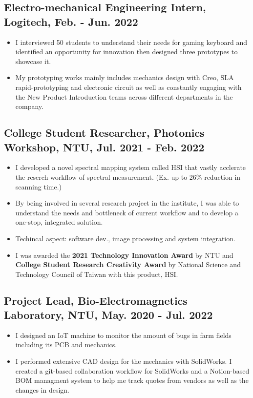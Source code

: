 \documentclass[12pt]{article}
\begin{document}
        \subsection*{Electro-mechanical Engineering Intern, Logitech, Feb. - Jun. 2022}
        {\sffamily
        \begin{itemize}
            \item I interviewed 50 students to understand their needs for gaming keyboard and identified an opportunity for innovation then designed three prototypes to showcase it.
            \item My prototyping works mainly includes mechanics design with Creo, SLA rapid-prototyping and electronic circuit as well as constantly engaging with the New Product Introduction teams across different departments in the company.
        \end{itemize}
        }
        \subsection*{College Student Researcher, Photonics Workshop, NTU, Jul. 2021 - Feb. 2022}
        {\sffamily
        \begin{itemize}
            \item I developed a novel spectral mapping system called HSI that vastly acclerate the reserch workflow of spectral measurement. (Ex. up to 26\% reduction in scanning time.)
            \item By being involved in several research project in the institute, I was able to understand the needs and bottleneck of current workflow and to develop a one-stop, integrated solution. 
            \item Techincal aspect: software dev., image processing and system integration. 
            \item I was awarded the \textbf{2021 Technology Innovation Award} by NTU and \textbf{College Student Research Creativity Award} by National Science and Technology Council of Taiwan with this product, HSI.
        \end{itemize}}
        \subsection*{Project Lead, Bio-Electromagnetics Laboratory, NTU, May. 2020 - Jul. 2022}
        {\sffamily
        \begin{itemize}
            \item I designed an IoT machine to monitor the amount of bugs in farm fields including its PCB and mechanics.
            \item I performed extensive CAD design for the mechanics with SolidWorks. I created a git-based collaboration workflow for SolidWorks and a Notion-based BOM managment system to help me track quotes from vendors as well as the changes in design.
        \end{itemize}
        }
\end{document}
